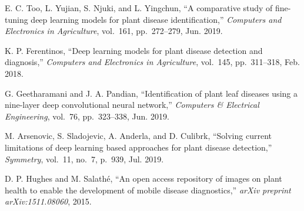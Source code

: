 \documentclass[12pt,a4paper]{report}
\begin{document}
\begin{enumerate}[label={[\arabic*]}, leftmargin=1.5cm, itemsep=6pt]
\item E. C. Too, L. Yujian, S. Njuki, and L. Yingchun, ``A comparative study of fine-tuning deep learning models for plant disease identification,'' \textit{Computers and Electronics in Agriculture}, vol.~161, pp.~272--279, Jun. 2019.

\item K. P. Ferentinos, ``Deep learning models for plant disease detection and diagnosis,'' \textit{Computers and Electronics in Agriculture}, vol.~145, pp.~311--318, Feb. 2018.

\item G. Geetharamani and J. A. Pandian, ``Identification of plant leaf diseases using a nine-layer deep convolutional neural network,'' \textit{Computers \& Electrical Engineering}, vol.~76, pp.~323--338, Jun. 2019.

\item M. Arsenovic, S. Sladojevic, A. Anderla, and D. Culibrk, ``Solving current limitations of deep learning based approaches for plant disease detection,'' \textit{Symmetry}, vol.~11, no.~7, p.~939, Jul. 2019.

\item D. P. Hughes and M. Salath\'{e}, ``An open access repository of images on plant health to enable the development of mobile disease diagnostics,'' \textit{arXiv preprint arXiv:1511.08060}, 2015.

\end{enumerate}

\end{document}
